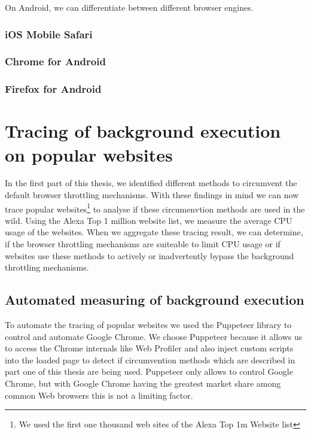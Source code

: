 \documentclass[article,type=bsc,colorback,accentcolor=tud9c]{tudthesis}
\begin{document}
  On Android, we can differentiate between different browser engines.

  \subsubsection{iOS Mobile Safari}

  \subsubsection{Chrome for Android}

  \subsubsection{Firefox for Android}

  \newpage
  \section{Tracing of background execution on popular websites}

  In the first part of this thesis, we identified different methods to circumvent the default browser throttling mechanisms. With these findings in mind we can now trace popular websites\footnote{We used the first one thousand web sites of the Alexa Top 1m Website list} to analyse if these circumenvtion methods are used in the wild. Using the Alexa Top 1 million website list, we measure the average CPU usage of the websites. When we aggregate these tracing result, we can determine, if the browser throttling mechanisms are suiteable to limit CPU usage or if websites use these methods to actively or inadvertently bypass the background throttling mechanisms.
  
  \subsection{Automated measuring of background execution}

  To automate the tracing of popular websites we used the Puppeteer\cite{pptr} library to control and automate Google Chrome. We choose Puppeteer because it allows us to access the Chrome internals like Web Profiler and also inject custom scripts into the loaded page to detect if circumvention methods which are described in part one of this thesis are being used. Puppeteer only allows to control Google Chrome, but with Google Chrome having the greatest market share among common Web browsers this is not a limiting factor.
\end{document}

